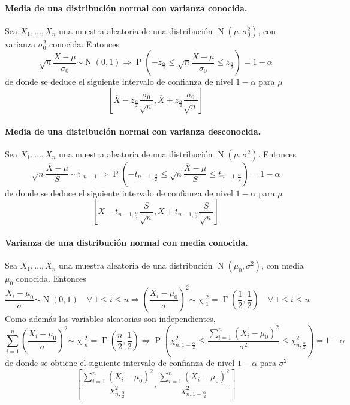 \documentclass[11pt]{article}
\theoremstyle{plain}
\theoremstyle{definition}
\theoremstyle{remark}
\newcommand{\proba}{\ensuremath{\operatorname{P}}}  %
\newcommand{\foralle}{\ensuremath{\forall \ }}  %
\newcommand{\dists}[1]{\ensuremath{\operatorname{#1}}}  %
\newcommand{\dist}[1]{\ensuremath{\sim \operatorname{#1}}}  %
\begin{document}
      \paragraph{Media de una distribución normal con varianza conocida.} Sea $X_1, \dots, X_n$ una muestra aleatoria de una distribución $\dists{N}(\mu,\sigma_0^2)$, con varianza $\sigma_0^2$ conocida. Entonces
      \[ \sqrt{n} \frac{\overline{X} - \mu}{\sigma_0} \dist{N} (0,1) \Rightarrow \proba \left( -z_{\frac{\alpha}{2}} \leq \sqrt{n} \frac{\overline{X} - \mu}{\sigma_0} \leq z_{\frac{\alpha}{2}} \right) = 1 - \alpha \]
      de donde se deduce el siguiente intervalo de confianza de nivel $1 - \alpha$ para $\mu$
      \[ \left[ \overline{X} - z_{\frac{\alpha}{2}} \frac{\sigma_0}{\sqrt{n}}, \overline{X} + z_{\frac{\alpha}{2}} \frac{\sigma_0}{\sqrt{n}} \right] \]

      \paragraph{Media de una distribución normal con varianza desconocida.} Sea $X_1, \dots, X_n$ una muestra aleatoria de una distribución $\dists{N}(\mu,\sigma^2)$. Entonces
      \[ \sqrt{n} \frac{\overline{X} - \mu}{S} \dist{t}_{n-1} \Rightarrow \proba \left( -t_{n - 1, \frac{\alpha}{2}} \leq \sqrt{n} \frac{\overline{X} - \mu}{S} \leq t_{n - 1, \frac{\alpha}{2}} \right) = 1 - \alpha \]
      de donde se deduce el siguiente intervalo de confianza de nivel $1 - \alpha$ para $\mu$
      \[ \left[ \overline{X} - t_{n - 1, \frac{\alpha}{2}} \frac{S}{\sqrt{n}}, \overline{X} + t_{n - 1, \frac{\alpha}{2}} \frac{S}{\sqrt{n}} \right] \]

      \paragraph{Varianza de una distribución normal con media conocida.} Sea $X_1, \dots, X_n$ una muestra aleatoria de una distribución $\dists{N}(\mu_0,\sigma^2)$, con media $\mu_0$ conocida. Entonces
      \[ \frac{X_i - \mu_0}{\sigma} \dist{N}(0,1) \quad \foralle 1 \leq i \leq n \Rightarrow \left( \frac{X_i - \mu_0}{\sigma} \right)^2 \dist{\chi}_1^2 = \dists{\Gamma}\left( \frac{1}{2}, \frac{1}{2} \right) \quad \foralle 1 \leq i \leq n \]
      Como además las variables aleatorias son independientes,
      \[ \sum_{i = 1}^n \left( \frac{X_i - \mu_0}{\sigma} \right)^2 \dist{\chi}_n^2 = \dists{\Gamma}\left( \frac{n}{2}, \frac{1}{2} \right) \Rightarrow \proba\left( \chi_{n, 1 - \frac{\alpha}{2}}^2 \leq \frac{\sum_{i=1}^n (X_i - \mu_0)^2}{\sigma^2} \leq \chi_{n, \frac{\alpha}{2}}^2 \right) = 1 -\alpha \]
      de donde se obtiene el siguiente intervalo de confianza de nivel $1 - \alpha$ para $\sigma^2$
      \[ \left[ \frac{\sum_{i = 1}^n (X_i - \mu_0)^2}{\chi_{n,\frac{\alpha}{2}}^2} , \frac{\sum_{i = 1}^n (X_i - \mu_0)^2}{\chi_{n,1 - \frac{\alpha}{2}}^2} \right] \]
\end{document}

